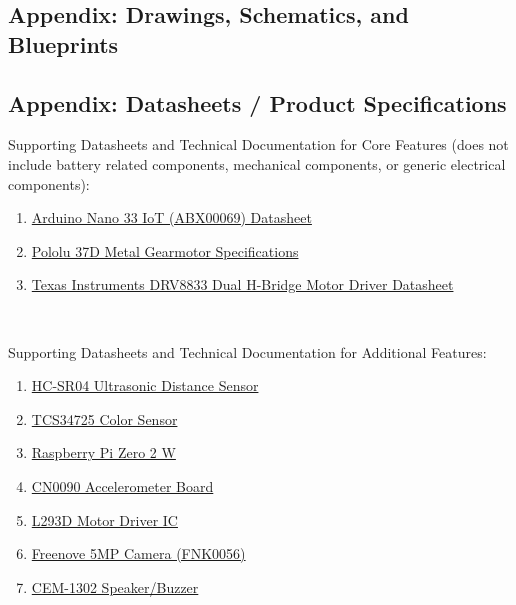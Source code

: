 \documentclass{article}
\begin{document}
\subsection{Appendix: Drawings, Schematics, and Blueprints}

\subsection{Appendix: Datasheets / Product Specifications}
Supporting Datasheets and Technical Documentation for Core Features (does not include battery related components, mechanical components, or generic electrical components):

\begin{enumerate}
    \item \href{https://docs.arduino.cc/resources/datasheets/ABX00069-datasheet.pdf}{Arduino Nano 33 IoT (ABX00069) Datasheet}
    \item \href{https://www.pololu.com/file/0J1736/pololu-37d-metal-gearmotors-rev-1-2.pdf}{Pololu 37D Metal Gearmotor Specifications}
    \item \href{https://www.ti.com/lit/ds/symlink/drv8833.pdf?ts=1743785858420}{Texas Instruments DRV8833 Dual H-Bridge Motor Driver Datasheet}
\end{enumerate}

\

Supporting Datasheets and Technical Documentation for Additional Features:
\begin{enumerate}
    \item \href{https://cdn.sparkfun.com/datasheets/Sensors/Proximity/HCSR04.pdf}{HC-SR04 Ultrasonic Distance Sensor}
    \item \href{https://cdn-shop.adafruit.com/datasheets/TCS34725.pdf}{TCS34725 Color Sensor}
    \item \href{https://datasheets.raspberrypi.com/rpizero2/raspberry-pi-zero-2-w-product-brief.pdf}{Raspberry Pi Zero 2 W}
    \item \href{https://mm.digikey.com/Volume0/opasdata/d220001/medias/docus/60/CN0090%20DATASHEET.pdf}{CN0090 Accelerometer Board}
    \item \href{https://www.st.com/content/ccc/resource/technical/document/datasheet/d3/84/d5/f6/3c/23/40/7b/CD00001883.pdf/files/CD00001883.pdf/jcr:content/translations/en.CD00001883.pdf}{L293D Motor Driver IC}
    \item \href{https://store.freenove.com/products/fnk0056}{Freenove 5MP Camera (FNK0056)}
    \item \href{https://www.sameskydevices.com/product/resource/cem-1203-42-.pdf?srsltid=AfmBOorbfJiXs7OIBQN95JLHokXYxTFx0Sd8qTPObMLqcfIHXVElk2uz}{CEM-1302 Speaker/Buzzer}
\end{enumerate}
\end{document}
